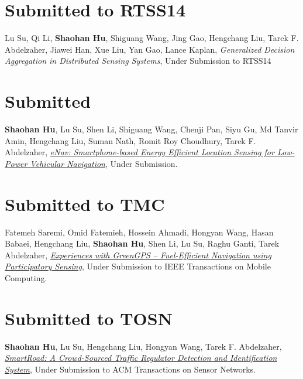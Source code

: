 \section{\sc Submitted to RTSS14}\hypertarget{su2014rtss}{}
Lu Su, Qi Li, \textbf{Shaohan Hu}, Shiguang Wang, Jing Gao, Hengchang
Liu, Tarek F. Abdelzaher, Jiawei Han, Xue Liu, Yan Gao, Lance Kaplan, \emph{Generalized Decision Aggregation in Distributed Sensing Systems}, \textsf{Under Submission to RTSS14} %


\section{\sc Submitted}\hypertarget{hu2014sensys}{}
\textbf{Shaohan Hu}, Lu Su, Shen Li, Shiguang Wang, Chenji Pan, Siyu Gu, Md Tanvir Amin,
Hengchang Liu, Suman Nath, Romit Roy Choudhury, Tarek F. Abdelzaher, \href{}{\emph{eNav:
  Smartphone-based Energy Efficient Location Sensing for Low-Power
  Vehicular Navigation}}, \textsf{Under Submission}. %


\section{\sc Submitted to TMC}\hypertarget{saremi2014tmc}{}
Fatemeh Saremi, Omid Fatemieh, Hossein Ahmadi, Hongyan Wang, Hasan Babaei, Hengchang Liu, \textbf{Shaohan Hu}, Shen Li, Lu Su, Raghu Ganti, Tarek Abdelzaher, \href{}{\emph{Experiences with GreenGPS – Fuel-Efficient Navigation using Participatory Sensing}}, \textsf{Under Submission to IEEE Transactions on Mobile Computing}. %

\section{\sc Submitted to TOSN}\hypertarget{hu2013tosn}{}
\textbf{Shaohan Hu}, Lu Su, Hengchang Liu, Hongyan Wang, Tarek F.
Abdelzaher, \href{}{\emph{SmartRoad: A Crowd-Sourced Traffic
  Regulator Detection and Identification System}}, \textsf{Under Submission to ACM Transactions on Sensor Networks}. %